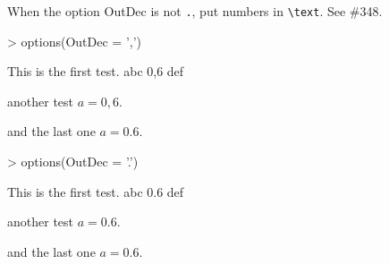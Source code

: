 \documentclass{article}
\begin{document}


When the option OutDec is not \texttt{.}, put numbers in \texttt{\textbackslash{}text}. See \#348.

\begin{Schunk}
\begin{Sinput}
> options(OutDec = ',')
\end{Sinput}
\end{Schunk}

This is the first test. abc 0,6 def

another test $a = 0,6$.

and the last one $a = 0.6$.

\begin{Schunk}
\begin{Sinput}
> options(OutDec = '.')
\end{Sinput}
\end{Schunk}

This is the first test. abc 0.6 def

another test $a = 0.6$.

and the last one $a = 0.6$.
\end{document}

